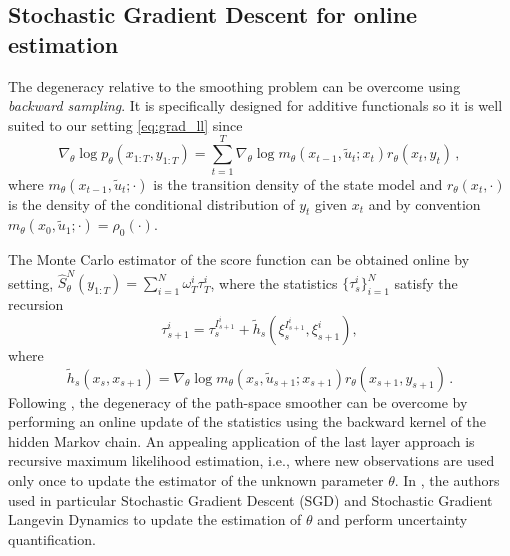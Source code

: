 \documentclass[conference]{IEEEtran}
\begin{document}
\subsection{Stochastic Gradient Descent for online estimation}
The degeneracy relative to the smoothing problem can be overcome using
\emph{backward sampling}. It is specifically designed for additive functionals so it is well suited to our setting \eqref{eq:grad_ll} since
$$
	\nabla_\theta\log p_\theta(x_{1:T}, y_{1:T}) = \sum_{t=1}^T \nabla_\theta \log m_{\theta}(x_{t-1},\widetilde u_t;x_t)  r_{\theta}(x_{t},y_t)\,,
$$
where $m_{\theta}(x_{t-1},\widetilde u_t;\cdot)$ is the transition density of the state model and $r_{\theta}(x_{t},\cdot)$ is the density of the conditional distribution of $y_t$ given $x_t$ and by convention $m_{\theta}(x_{0},\widetilde u_1;\cdot) = \rho_0(\cdot)$.

The Monte Carlo estimator of the score function can be obtained online  by setting,
$	\widehat {S}^N_\theta(y_{1:T}) = \sum_{i = 1}^N \omega_T^i\tau_T^i$,
where the statistics $\{\tau_s^i\}_{i = 1}^N$ satisfy the recursion
\begin{equation}
	\label{eq:pms:online}
	\tau_{s + 1}^{i} = \tau_{s}^{I_{s+1}^{i}} + \tilde{h}_s(\xi_{s}^{I_{s+1}^{i}}, \xi_{s + 1}^{i}),
\end{equation}
where
$$
	\tilde{h}_s(x_s,x_{s+1}) = \nabla_\theta \log m_{\theta}(x_{s},\widetilde u_{s+1};x_{s+1}) r_{\theta}(x_{s+1},y_{s+1})\,.
$$
Following \cite{DelMoral2010,Olsson2014EfficientPO,martin2020backward,gloaguen2022pseudo}, the degeneracy of the path-space smoother can be overcome by performing an online update of the statistics using the backward kernel of the hidden Markov chain.
An appealing application of the last layer approach is recursive maximum likelihood estimation, i.e., where new observations are used only once to update the estimator of the unknown parameter $\theta$. In \cite{Brosse2020OnLA}, the authors used in particular Stochastic Gradient Descent (SGD) and Stochastic Gradient Langevin Dynamics to update the estimation of $\theta$ and perform uncertainty quantification.
\end{document}
